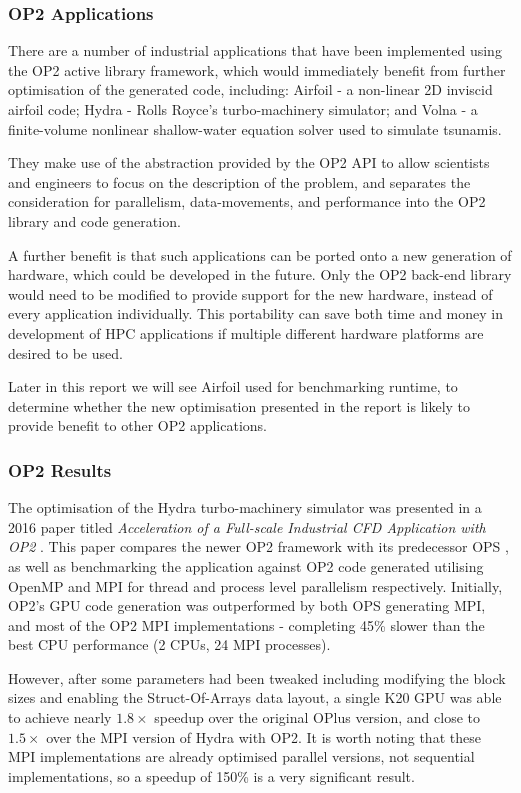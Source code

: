 \subsubsection{OP2 Applications}
There are a number of industrial applications that have been implemented using the OP2 active library framework, which would immediately benefit from further optimisation of the generated code, including: Airfoil \cite{airfoil} - a non-linear 2D inviscid airfoil code; Hydra \cite{hydra} - Rolls Royce’s turbo-machinery simulator; and Volna \cite{volna} - a finite-volume nonlinear shallow-water equation solver used to simulate tsunamis.
\par
They make use of the abstraction provided by the OP2 API to allow scientists and engineers to focus on the description of the problem, and separates the consideration for parallelism, data-movements, and performance into the OP2 library and code generation.
\par
A further benefit is that such applications can be ported onto a new generation of hardware, which could be developed in the future. Only the OP2 back-end library would need to be modified to provide support for the new hardware, instead of every application individually. This portability can save both time and money in development of HPC applications if multiple different hardware platforms are desired to be used.
\par
Later in this report we will see Airfoil used for benchmarking runtime, to determine whether the new optimisation presented in the report is likely to provide benefit to other OP2 applications.

\subsubsection{OP2 Results}
The optimisation of the Hydra turbo-machinery simulator was presented in a 2016 paper titled \textit{Acceleration of a Full-scale Industrial CFD Application with OP2} \cite{hydrapaper}. This paper compares the newer OP2 framework with its predecessor OPS \cite{ops}, as well as benchmarking the application against OP2 code generated utilising OpenMP \cite{OpenMP} and MPI \cite{MPI} for thread and process level parallelism respectively. Initially, OP2's GPU code generation was outperformed by both OPS generating MPI, and most of the OP2 MPI implementations - completing 45\% slower than the best CPU performance (2 CPUs, 24 MPI processes).
\par However, after some parameters had been tweaked including modifying the block sizes and enabling the Struct-Of-Arrays data layout, a single K20 GPU was able to achieve nearly $1.8\times$ speedup over the original OPlus version, and close to $1.5\times$ over the MPI version of Hydra with OP2. It is worth noting that these MPI implementations are already optimised parallel versions, not sequential implementations, so a speedup of 150\% is a very significant result.
\clearpage

